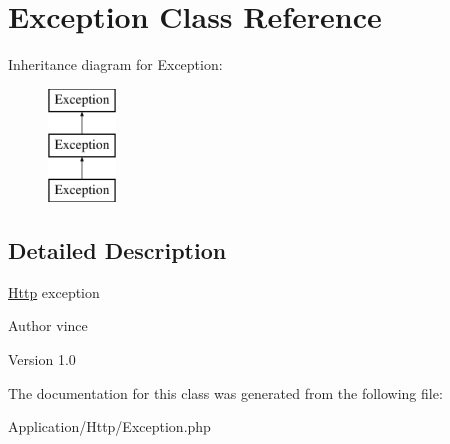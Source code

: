 \hypertarget{class_anemo_1_1_application_1_1_http_1_1_exception}{
\section{Exception Class Reference}
\label{class_anemo_1_1_application_1_1_http_1_1_exception}
}
Inheritance diagram for Exception:\begin{figure}[H]
\begin{center}
\leavevmode
\includegraphics[height=3.000000cm]{class_anemo_1_1_application_1_1_http_1_1_exception}
\end{center}
\end{figure}


\subsection{Detailed Description}
\hyperlink{namespace_anemo_1_1_application_1_1_http}{Http} exception \begin{DoxyAuthor}{Author}
vince 
\end{DoxyAuthor}
\begin{DoxyVersion}{Version}
1.0 
\end{DoxyVersion}


The documentation for this class was generated from the following file:\begin{DoxyCompactItemize}
\item 
Application/Http/Exception.php\end{DoxyCompactItemize}

